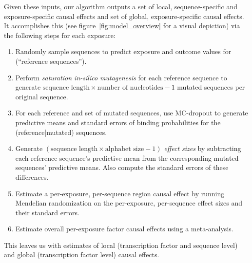 \documentclass{article}
\begin{document}
Given these inputs, our algorithm outputs a set of local, sequence-specific and exposure-specific causal effects and set of global, exposure-specific causal effects. It accomplishes this (see figure~\ref{fig:model_overview} for a visual depiction) via the following steps for each exposure:
\begin{enumerate}
    \item Randomly sample sequences to predict exposure and outcome values for (``reference sequences'').
    \item Perform \textit{saturation in-silico mutagenesis} for each reference sequence to generate \( \text{sequence\ length} \times \text{number\ of\ nucleotides} - 1 \) mutated sequences per original sequence.
    \item For each reference and set of mutated sequences, use MC-dropout  to generate predictive means and standard errors of binding probabilities for the (reference|mutated) sequences.
    \item Generate \( (\text{sequence length} \times \text{alphabet size} - 1) \) \textit{effect sizes} by subtracting each reference sequence's predictive mean from the corresponding mutated sequences' predictive means. Also compute the standard errors of these differences.
    \item Estimate a per-exposure, per-sequence region causal effect by running Mendelian randomization on the per-exposure, per-sequence effect sizes and their standard errors.
    \item Estimate overall per-exposure factor causal effects using a meta-analysis.
\end{enumerate}

This leaves us with estimates of local (transcription factor and sequence level) and global (transcription factor level) causal effects. 

\end{document}
